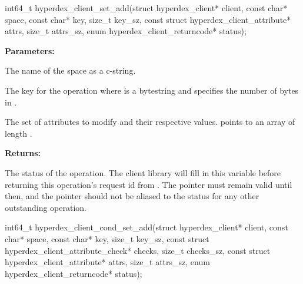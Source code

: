 \funcsep
{}
\begin{ccode}
int64_t hyperdex_client_set_add(struct hyperdex_client* client,
                const char* space,
                const char* key, size_t key_sz,
                const struct hyperdex_client_attribute* attrs, size_t attrs_sz,
                enum hyperdex_client_returncode* status);
\end{ccode}
\funcdesc 

\noindent\textbf{Parameters:}
\begin{description}[labelindent=\widthof{{\code{attrs}, \code{attrs\_sz}}},leftmargin=*,noitemsep,nolistsep,align=right]
\item[\code{space}] The name of the space as a c-string.
\item[\code{key}, \code{key\_sz}] The key for the operation where  is a bytestring and  specifies the number of bytes in .
\item[\code{attrs}, \code{attrs\_sz}] The set of attributes to modify and their respective values.   points to an array of length .
\end{description}

\noindent\textbf{Returns:}
\begin{description}[labelindent=\widthof{{\code{status}}},leftmargin=*,noitemsep,nolistsep,align=right]
\item[\code{status}] The status of the operation.  The client library will fill in this variable before returning this operation's request id from .  The pointer must remain valid until then, and the pointer should not be aliased to the status for any other outstanding operation.
\end{description}

\funcsep
{}
\begin{ccode}
int64_t hyperdex_client_cond_set_add(struct hyperdex_client* client,
                const char* space,
                const char* key, size_t key_sz,
                const struct hyperdex_client_attribute_check* checks, size_t checks_sz,
                const struct hyperdex_client_attribute* attrs, size_t attrs_sz,
                enum hyperdex_client_returncode* status);
\end{ccode}
\funcdesc 

